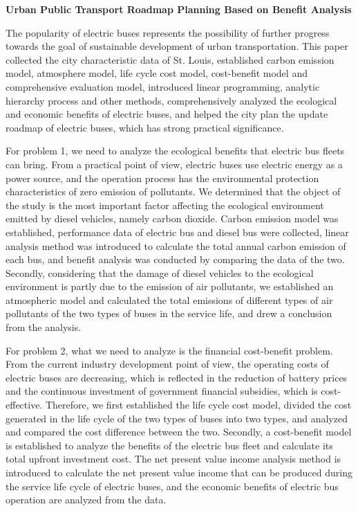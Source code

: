\documentclass[12pt]{article}
\begin{document}
\thispagestyle{empty}

\medskip
\begin{center}
\large\bfseries Urban Public Transport Roadmap Planning Based on Benefit Analysis
\end{center}
The popularity of electric buses represents the possibility of further progress towards the goal of sustainable development of 
urban transportation. This paper collected the city characteristic data of St. Louis, established carbon emission model, atmosphere 
model, life cycle cost model, cost-benefit model and comprehensive evaluation model, introduced linear programming, analytic hierarchy 
process and other methods, comprehensively analyzed the ecological and economic benefits of electric buses, and helped the city plan 
the update roadmap of electric buses, which has strong practical significance.

For problem 1, we need to analyze the ecological benefits that electric bus fleets can bring. From a practical point of 
view, electric buses use electric energy as a power source, and the operation process has the environmental protection characteristics 
of zero emission of pollutants. We determined that the object of the study is the most important factor affecting the ecological 
environment emitted by diesel vehicles, namely carbon dioxide. Carbon emission model was established, performance data of electric 
bus and diesel bus were collected, linear analysis method was introduced to calculate the total annual carbon emission of each bus, 
and benefit analysis was conducted by comparing the data of the two. Secondly, considering that the damage of diesel vehicles to the 
ecological environment is partly due to the emission of air pollutants, we established an atmospheric model and calculated the total 
emissions of different types of air pollutants of the two types of buses in the service life, and drew a conclusion from the analysis.

For problem 2, what we need to analyze is the financial cost-benefit problem. From the current industry development point of view, 
the operating costs of electric buses are decreasing, which is reflected in the reduction of battery prices and the continuous 
investment of government financial subsidies, which is cost-effective. Therefore, we first established the life cycle cost model, 
divided the cost generated in the life cycle of the two types of buses into two types, and analyzed and compared the cost difference 
between the two. Secondly, a cost-benefit model is established to analyze the benefits of the electric bus fleet and calculate its 
total upfront investment cost. The net present value income analysis method is introduced to calculate the net present value income 
that can be produced during the service life cycle of electric buses, and the economic benefits of electric bus operation are analyzed 
from the data.
\end{document}
